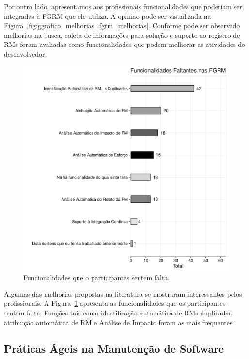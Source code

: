 Por outro lado, apresentamos aos profissionais funcionalidades que poderiam ser
integradas à FGRM que ele utiliza. A opinião pode ser visualizada na
Figura~\ref{fig:ggrafico_melhorias_fgrm_melhorias}. Conforme pode ser observado
melhorias na busca, coleta de informações para solução e suporte ao registro de
RMs foram avaliadas como funcionalidades que podem melhorar as atividades do
desenvolvedor.

\begin{figure}[htpb]
	\centering
	\includegraphics[width=0.6\linewidth]{./chapter-pesquisa-com-profissionais/img/grafico_melhorias_fgrm_funcionalidades_faltantes.pdf}
	\caption{Funcionalidades que o participantes sentem falta.}
\label{fig:grafico_melhorias_fgrm_funcionalidades_falantes}
\end{figure}

Algumas das melhorias propostas na literatura se mostraram interessantes pelos
profissionais. A
Figura~\ref{fig:grafico_melhorias_fgrm_funcionalidades_falantes} apresenta as
funcionalidades que os participantes sentem falta. Funções tais como
identificação automática de RMs duplicadas, atribuição automática de RM e
Análise de Impacto foram as mais frequentes.

\todoend{}

\subsection{Práticas Ágeis na Manutenção de Software}
\label{sub:práticas_ágeis_na_manutenção_de_software}

